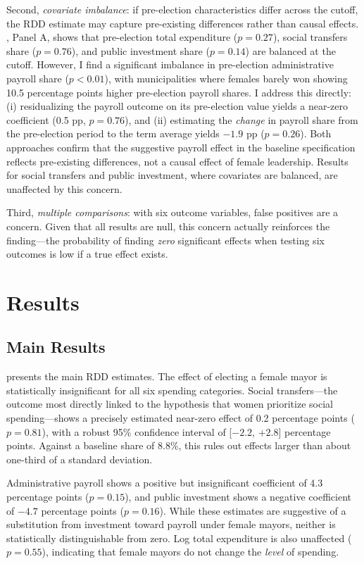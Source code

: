 \documentclass[12pt]{article}
\begin{document}
Second, \textit{covariate imbalance}: if pre-election characteristics differ across the cutoff, the RDD estimate may capture pre-existing differences rather than causal effects. , Panel A, shows that pre-election total expenditure ($p=0.27$), social transfers share ($p=0.76$), and public investment share ($p=0.14$) are balanced at the cutoff. However, I find a significant imbalance in pre-election administrative payroll share ($p < 0.01$), with municipalities where females barely won showing 10.5 percentage points higher pre-election payroll shares. I address this directly: (i) residualizing the payroll outcome on its pre-election value yields a near-zero coefficient (0.5 pp, $p=0.76$), and (ii) estimating the \textit{change} in payroll share from the pre-election period to the term average yields $-1.9$ pp ($p=0.26$). Both approaches confirm that the suggestive payroll effect in the baseline specification reflects pre-existing differences, not a causal effect of female leadership. Results for social transfers and public investment, where covariates are balanced, are unaffected by this concern.

Third, \textit{multiple comparisons}: with six outcome variables, false positives are a concern. Given that all results are null, this concern actually reinforces the finding---the probability of finding \textit{zero} significant effects when testing six outcomes is low if a true effect exists.


\section{Results}

\subsection{Main Results}



 presents the main RDD estimates. The effect of electing a female mayor is statistically insignificant for all six spending categories. Social transfers---the outcome most directly linked to the hypothesis that women prioritize social spending---shows a precisely estimated near-zero effect of 0.2 percentage points ($p = 0.81$), with a robust 95\% confidence interval of [$-2.2$, $+2.8$] percentage points. Against a baseline share of 8.8\%, this rules out effects larger than about one-third of a standard deviation.

Administrative payroll shows a positive but insignificant coefficient of 4.3 percentage points ($p = 0.15$), and public investment shows a negative coefficient of $-4.7$ percentage points ($p = 0.16$). While these estimates are suggestive of a substitution from investment toward payroll under female mayors, neither is statistically distinguishable from zero. Log total expenditure is also unaffected ($p = 0.55$), indicating that female mayors do not change the \textit{level} of spending.
\end{document}
